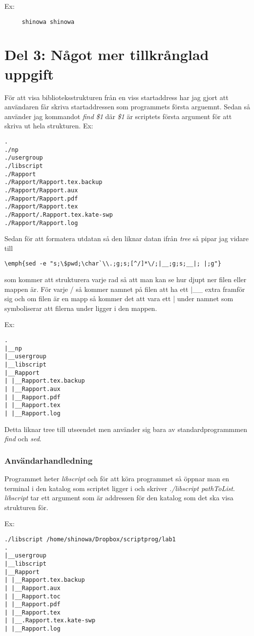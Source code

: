 \documentclass[11pt, titlepage, oneside, a4paper]{article}
\newcommand{\Section}[1]{\section{#1}\vspace{-8pt}}
\newcommand{\Subsubsection}[1]{\vspace{-4pt}\subsubsection{#1}\vspace{-8pt}}
\begin{document}
	Ex:
	\begin{verbatim}
	 shinowa shinowa
	\end{verbatim}

	
	\Section{Del 3: Något mer tillkrånglad uppgift}	
	För att visa biblioteksstrukturen från en viss startaddress har jag gjort att användaren får skriva startaddressen som programmets första arguemnt. Sedan så använder jag kommandot \emph{find \$1} där \emph{\$1} är scriptets första argument för att skriva ut hela strukturen.
	Ex:
	\begin{verbatim}
.
./np
./usergroup
./libscript
./Rapport
./Rapport/Rapport.tex.backup
./Rapport/Rapport.aux
./Rapport/Rapport.pdf
./Rapport/Rapport.tex
./Rapport/.Rapport.tex.kate-swp
./Rapport/Rapport.log

	\end{verbatim}

	Sedan för att formatera utdatan så den liknar 
	datan ifrån \emph{tree} så pipar jag vidare till \begin{verbatim}
\emph{sed -e "s;\$pwd;\char`\\.;g;s;[^/]*\/;|__;g;s;__|; |;g"}
	                                                 \end{verbatim}
 som kommer att strukturera varje rad så att man kan 
	se hur djupt ner filen eller mappen är. För varje / så kommer namnet på filen att ha ett |\_\_ extra framför sig och om filen är en mapp så kommer det att vara ett | under namnet som symboliserar att
	filerna under ligger i den mappen.
	
	Ex:
	\begin{verbatim}
.
|__np
|__usergroup
|__libscript
|__Rapport
| |__Rapport.tex.backup
| |__Rapport.aux
| |__Rapport.pdf
| |__Rapport.tex
| |__Rapport.log
	\end{verbatim}

	Detta liknar tree till utseendet men använder sig bara av standardprogrammmen \emph{find} och \emph{sed}.
	
	\Subsubsection{Användarhandledning}
	Programmet heter \emph{libscript} och för att köra programmet så öppnar man en terminal i den katalog som scriptet ligger i och skriver \emph{./libscript pathToList}.
	\emph{libscript} tar ett argument som är addressen för den katalog som det ska visa strukturen för.
	
	Ex: \begin{verbatim}
./libscript /home/shinowa/Dropbox/scriptprog/lab1
.
|__usergroup
|__libscript
|__Rapport
| |__Rapport.tex.backup
| |__Rapport.aux
| |__Rapport.toc
| |__Rapport.pdf
| |__Rapport.tex
| |__.Rapport.tex.kate-swp
| |__Rapport.log

	    \end{verbatim}
\end{document}
